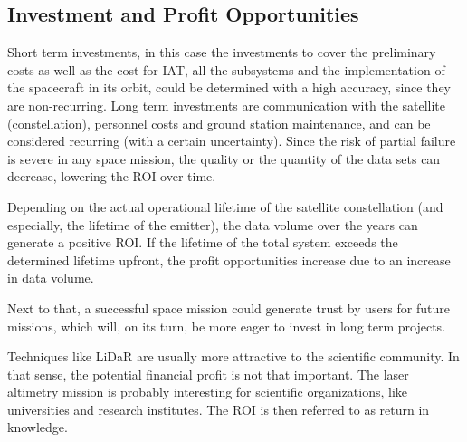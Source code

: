 \subsection{Investment and Profit Opportunities}
	\label{blMAipo}
Short term investments, in this case the investments to cover the preliminary costs as well as the cost for \acs{IAT}, all the subsystems and the implementation of the spacecraft in its orbit, could be determined with a high accuracy, since they are non-recurring. Long term investments are communication with the satellite (constellation), personnel costs and ground station maintenance, and can be considered recurring (with a certain uncertainty). Since the risk of partial failure is severe in any space mission, the quality or the quantity of the data sets can decrease, lowering the \acs{ROI} over time. 

Depending on the actual operational lifetime of the satellite constellation (and especially, the lifetime of the emitter), the data volume over the years can generate a positive \acs{ROI}. If the lifetime of the total system exceeds the determined lifetime upfront, the profit opportunities increase due to an increase in data volume. 

Next to that, a successful space mission could generate trust by users for future missions, which will, on its turn, be more eager to invest in long term projects.

Techniques like \acs{LiDaR} are usually more attractive to the scientific community. In that sense, the potential financial profit is not that important. The \acs{laser} altimetry mission is probably interesting for scientific organizations, like universities and research institutes. The \acs{ROI} is then referred to as return in knowledge.  